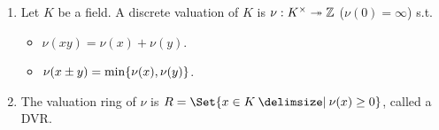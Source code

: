 \begin{definition} \mbox{}
  \begin{enumerate}[(1)]
    \item Let $K$ be a field. A discrete valuation of $K$ is
      $\nu: K^\times \twoheadrightarrow \mathbb{Z}$ ($\nu(0) = \infty$) s.t.
      \begin{itemize}
        \item $\nu(xy) = \nu(x) + \nu(y)$.
        \item $\nu(x \pm y) = \min\lbrace\nu(x), \nu(y)\rbrace$.
      \end{itemize}
    \item The valuation ring of $\nu$ is $R = \Set{x \in K \given \nu(x) \ge 0}$,
      called a DVR.
  \end{enumerate}
\end{definition}
\iffalse
\begin{prop} \label{local-neotherian-ring-set-gen-max-gen-qoetient-max}
  Let R be a local Noetherian ring with maximal ideal $\mf$. Then $t_1, \cdots t_n
  \in \mf$ generate $\mf$ if and only if thier images generate $\mf / \mf^2$ as an
  $R/\mf$ vector space.
  \begin{proof} \hfill
    The $"\Rightarrow"$ is simple. \\
    $"\Leftarrow"$ \\
    Let $N = \gen{t_1, \cdots , t_n} \subseteq \mf$ and images of $t_1, \cdots, t_n
    \in \mf / \mf^2$ generate $\mf / \mf^2$ as $R/\mf$-vector space, then we have
    $$
      N+\mf^2 = \mf + \mf^2 \implies (N + \mf^2) / N = (\mf + \mf^2) / N
      \implies \mf(\mf/N) = \mf / N
    $$
    where we have used $N/N = 0$ and $\mf + \mf^2 = \mf$. By Nakayama's lemma, $M =
     \mf / N$ is zero module, so $\mf = N$ and $t_1, \cdots, t_n$ generate $\mf$.
  \end{proof}
\end{prop}
\fi
